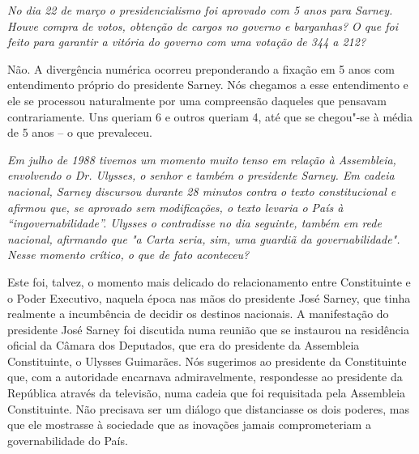 \medskip

\emph{No dia 22 de março o presidencialismo foi aprovado com 5 anos
para Sarney. Houve compra de votos, obtenção de cargos no governo e
barganhas? O que foi feito para garantir a vitória do governo com uma
votação de 344 a 212?}

Não. A divergência numérica ocorreu preponderando a
fixação em 5 anos com entendimento próprio do presidente Sarney. Nós
chegamos a esse entendimento e ele se processou naturalmente por uma
compreensão daqueles que pensavam contrariamente. Uns queriam 6 e outros
queriam 4, até que se chegou"-se à média de 5 anos -- o que prevaleceu.

\medskip

\emph{Em julho de 1988 tivemos um momento muito tenso em relação à
Assembleia, envolvendo o Dr. Ulysses, o senhor e também o presidente
Sarney. Em cadeia nacional, Sarney discursou durante 28 minutos contra o
texto constitucional e afirmou que, se aprovado sem modificações, o
texto levaria o País à ``ingovernabilidade''. Ulysses o contradisse no
dia seguinte, também em rede nacional, afirmando que "a Carta seria,
sim, uma guardiã da governabilidade". Nesse momento crítico, o que de
fato aconteceu?}

Este foi, talvez, o momento mais delicado do
relacionamento entre Constituinte e o Poder Executivo, naquela época nas
mãos do presidente José Sarney, que tinha realmente a incumbência de
decidir os destinos nacionais. A manifestação do presidente José Sarney
foi discutida numa reunião que se instaurou na residência oficial da
Câmara dos Deputados, que era do presidente da Assembleia Constituinte,
o Ulysses Guimarães. Nós sugerimos ao presidente da Constituinte que,
com a autoridade encarnava admiravelmente, respondesse ao presidente da
República através da televisão, numa cadeia que foi requisitada pela
Assembleia Constituinte. Não precisava ser um diálogo que distanciasse
os dois poderes, mas que ele mostrasse à sociedade que as inovações
jamais comprometeriam a governabilidade do País.

